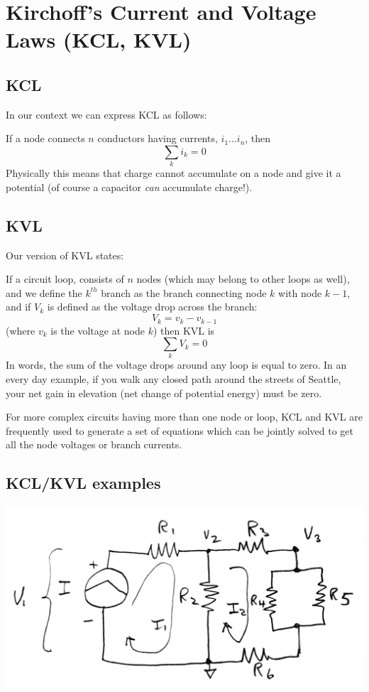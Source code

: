 \section{Kirchoff's Current and Voltage Laws (KCL, KVL)}

\subsection{KCL}
In our context we can express KCL as follows:

If a node connects $n$ conductors having currents, $i_1 \dots i_n$,
then
\[
\sum_k i_k = 0
\]
Physically this means that charge cannot accumulate on a node and give it a
potential (of course a capacitor {\it can} accumulate charge!).

\subsection{KVL}
Our version of KVL states:

If a circuit loop, consists of $n$ nodes (which may belong to other loops as well),
and we define the $k^{th}$ branch as the branch connecting node $k$ with node $k-1$, and if $V_k$ is defined as the voltage drop across the branch:
\[
V_k = v_k - v_{k-1}
\]
(where $v_k$ is the voltage at node $k$)
then KVL is
\[
\sum_k V_k = 0
\]
In words, the sum of the voltage drops around any loop is equal to zero. In an
every day example, if you walk any closed path around the streets of Seattle,
your net gain in elevation (net change of potential energy) must be zero.

For more complex circuits having more than one node or loop,
KCL and KVL are frequently used to generate a set of equations which can be
jointly solved to get all the node voltages or branch currents.


\subsection{KCL/KVL examples}


\includegraphics[width=.75\textwidth]{figsChapt01/IG95777.png}

